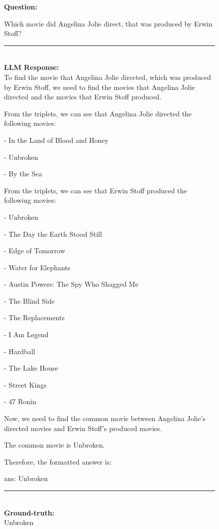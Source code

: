 \begin{figure}
\begin{tcolorbox}[colback=gray!5!white, colframe=gray!75!black, title=CWQ-WebQTrn-124\_405a78f132e69f4771aff40d07cd0294]
\scriptsize

\textbf{Question:}\\
\raggedright Which movie did Angelina Jolie direct, that was produced by Erwin Stoff?

\rule{\linewidth}{0.4pt}
\\
\textbf{LLM Response:}\\
To find the movie that Angelina Jolie directed, which was produced by Erwin Stoff, we need to find the movies that Angelina Jolie directed and the movies that Erwin Stoff produced.



From the triplets, we can see that Angelina Jolie directed the following movies:

- In the Land of Blood and Honey

- Unbroken

- By the Sea



From the triplets, we can see that Erwin Stoff produced the following movies:

- Unbroken

- The Day the Earth Stood Still

- Edge of Tomorrow

- Water for Elephants

- Austin Powers: The Spy Who Shagged Me

- The Blind Side

- The Replacements

- I Am Legend

- Hardball

- The Lake House

- Street Kings

- 47 Ronin



Now, we need to find the common movie between Angelina Jolie's directed movies and Erwin Stoff's produced movies.



The common movie is Unbroken.



Therefore, the formatted answer is:



ans: Unbroken

\rule{\linewidth}{0.4pt}
\\
\textbf{Ground-truth:}\\
Unbroken

\end{tcolorbox}
 

\end{figure}



